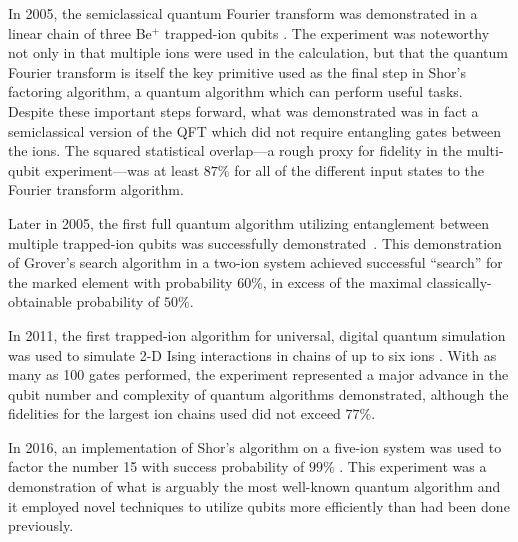 \documentclass[%
reprint,
 amsmath,amssymb,
]{revtex4-1}
\begin{document}
In 2005, the semiclassical quantum Fourier transform was demonstrated in a linear chain of three Be$^+$ trapped-ion qubits \cite{ChiaveriniQFT2005}. The experiment was noteworthy not only in that multiple ions were used in the calculation, but that the quantum Fourier transform is itself the key primitive used as the final step in Shor's factoring algorithm, a quantum algorithm which can perform useful tasks. Despite these important steps forward, what was demonstrated was in fact a semiclassical version of the QFT which did not require entangling gates between the ions. The squared statistical overlap---a rough proxy for fidelity in the multi-qubit experiment---was at least $87\%$ for all of the different input states to the Fourier transform algorithm.

Later in 2005, the first full quantum algorithm utilizing entanglement between multiple trapped-ion qubits was successfully demonstrated~\cite{BrickmanGroverSearch2005}. This demonstration of Grover's search algorithm in a two-ion system achieved successful ``search'' for the marked element with probability $60 \%$, in excess of the maximal classically-obtainable probability of $50 \%$.

In 2011, the first trapped-ion algorithm for universal, digital quantum simulation \cite{UniversalQSimLloyd1996} was used to simulate 2-D Ising interactions in chains of up to six ions \cite{LanyonDigSim2011}.  With as many as 100 gates performed, the experiment represented a major advance in the qubit number and complexity of quantum algorithms demonstrated, although the fidelities for the largest ion chains used did not exceed $77\%$.

In 2016, an implementation of Shor's algorithm on a five-ion system was used to factor the number 15 with success probability of $99 \%$ \cite{MonzScalableShor2016}. This experiment was a demonstration of what is arguably the most well-known quantum algorithm and it employed novel techniques to utilize qubits more efficiently than had been done previously.
\end{document}

